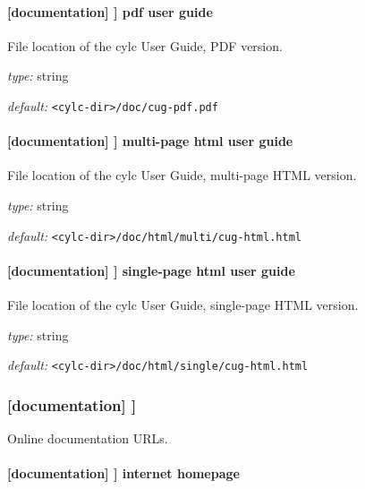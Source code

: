 \paragraph[pdf user guide]{[documentation] \textrightarrow [[files]] \textrightarrow pdf user guide }

File location of the cylc User Guide, PDF version.
\begin{myitemize}
\item {\em type:} string
\item {\em default:} \lstinline=<cylc-dir>/doc/cug-pdf.pdf=
\end{myitemize}

\paragraph[multi-page html user guide]{[documentation] \textrightarrow [[files]] \textrightarrow multi-page html user guide }

File location of the cylc User Guide, multi-page HTML version.
\begin{myitemize}
\item {\em type:} string
\item {\em default:} \lstinline=<cylc-dir>/doc/html/multi/cug-html.html=
\end{myitemize}

\paragraph[single-page html user guide]{[documentation] \textrightarrow [[files]] \textrightarrow single-page html user guide }

File location of the cylc User Guide, single-page HTML version.
\begin{myitemize}
\item {\em type:} string
\item {\em default:} \lstinline=<cylc-dir>/doc/html/single/cug-html.html=
\end{myitemize}

\subsubsection[{[[}urls{]]}]{[documentation] \textrightarrow [[urls]]}

Online documentation URLs.

\paragraph[internet homepage]{[documentation] \textrightarrow [[urls]] \textrightarrow internet homepage }


